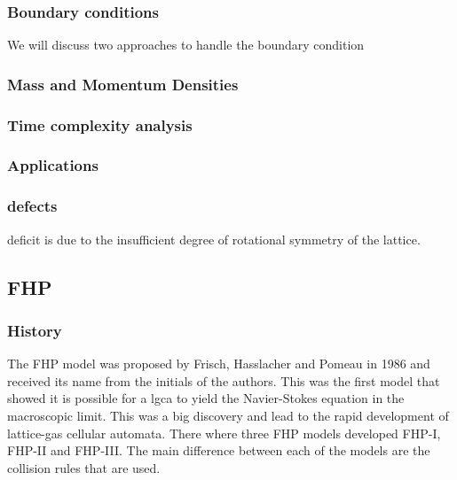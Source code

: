 \documentclass[a4paper,10pt]{article}
\begin{document}
\subsubsection{Boundary conditions}
We will discuss two approaches to handle the boundary condition 
\subsubsection{Mass and Momentum Densities}
\subsubsection{Time complexity analysis}
\subsubsection{Applications}
\subsubsection{defects}
deficit is due to the insufficient degree of rotational symmetry of the lattice.
\subsection{FHP}
\subsubsection{History}
The FHP model was proposed by Frisch, Hasslacher and Pomeau in 1986 and received its name from the initials of the authors. This was the first model that showed it is possible for a \acrshort{lgca} to yield the Navier-Stokes equation in the macroscopic limit. This was a big discovery and lead to the rapid development of lattice-gas cellular automata. There where three FHP models developed FHP-I, FHP-II and FHP-III.
The main difference between each of the models are the collision rules that are used.
\end{document}
